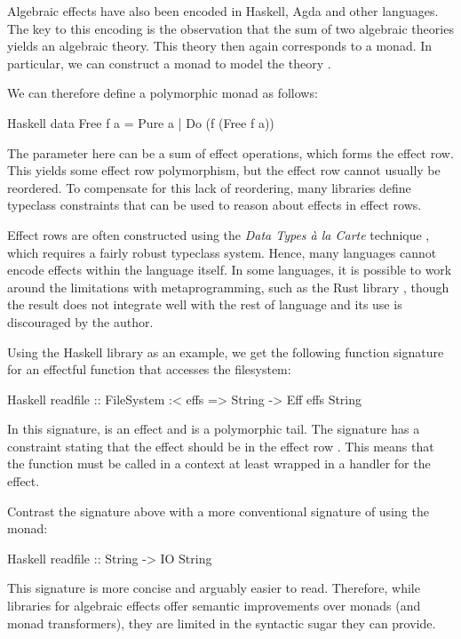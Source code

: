 Algebraic effects have also been encoded in Haskell, Agda and other languages. The key to this encoding is the observation that the sum of two algebraic theories yields an algebraic theory. This theory then again corresponds to a monad. In particular, we can construct a  monad to model the theory \autocite{kammar_handlers_2013,swierstra_data_2008}.

We can therefore define a polymorphic  monad as follows:
\begin{lst}{Haskell}
data Free f a
    = Pure a
    | Do (f (Free f a))
\end{lst}
The parameter  here can be a sum of effect operations, which forms the effect row. This yields some effect row polymorphism, but the effect row cannot usually be reordered. To compensate for this lack of reordering, many libraries define typeclass constraints that can be used to reason about effects in effect rows.

Effect rows are often constructed using the \emph{Data Types à la Carte} technique \autocite{swierstra_data_2008}, which requires a fairly robust typeclass system. Hence, many languages cannot encode effects within the language itself. In some languages, it is possible to work around the limitations with metaprogramming, such as the Rust library , though the result does not integrate well with the rest of language and its use is discouraged by the author.

Using the  Haskell library as an example, we get the following function signature for an effectful function that accesses the filesystem:
\begin{lst}{Haskell}
readfile :: FileSystem :< effs => String -> Eff effs String
\end{lst}
In this signature,  is an effect and  is a polymorphic tail. The signature has a constraint stating that the  effect should be in the effect row . This means that the  function must be called in a context at least wrapped in a handler for the  effect.

Contrast the signature above with a more conventional signature of  using the  monad:
\begin{lst}{Haskell}
readfile :: String -> IO String
\end{lst}
This signature is more concise and arguably easier to read. Therefore, while libraries for algebraic effects offer semantic improvements over monads (and monad transformers), they are limited in the syntactic sugar they can provide.

